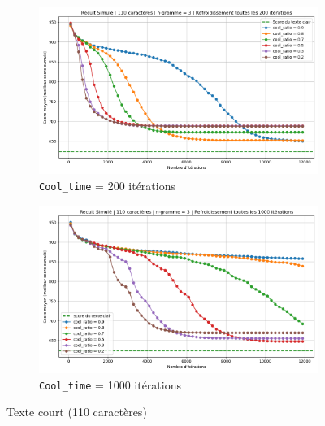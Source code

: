 \documentclass[a4paper]{article}
\begin{document}
\begin{figure}[H]
    \centering
    \begin{subfigure}[b]{0.49\textwidth}
        \includegraphics[width=\textwidth]{graphe_recuit_n_3_110_cool_time_200.png}
        \caption{\texttt{Cool\_time} = 200 itérations}
        \label{fig:n3-110-200}
    \end{subfigure}
    \hfill
    \begin{subfigure}[b]{0.49\textwidth}
        \includegraphics[width=\textwidth]{graphe_recuit_n_3_110_cool_time_1000.png}
        \caption{\texttt{Cool\_time} = 1000 itérations}
        \label{fig:n3-509-200}
    \end{subfigure}
    \caption{Texte court (110 caractères)}
    \label{fig:rs-n3-110}
\end{figure}
\end{document}
